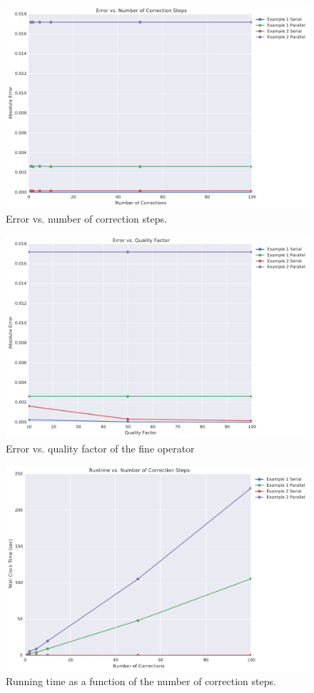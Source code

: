 \documentclass[letterpaper,12pt]{article}
\begin{document}
\begin{figure}
\includegraphics[width=0.75\linewidth]{data/error_vs_corrections.pdf}
\caption{Error vs. number of correction steps.}
\label{fig:err_v_k}
\end{figure}

\begin{figure}
\includegraphics[width=0.75\linewidth]{data/error_vs_qualityfactor.pdf}
\caption{Error vs. quality factor of the fine operator}
\label{fig:err_v_q}
\end{figure}

\begin{figure}
\includegraphics[width=0.75\linewidth]{data/runtime_vs_corrections.pdf}
\caption{Running time as a function of the number of correction steps.}
\label{fig:run_v_k}
\end{figure}
\end{document}
